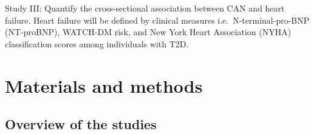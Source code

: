\documentclass[
  a4paper,
  headsepline=true,
  open=left]{scrbook}
\begin{document}
Study III: Quantify the cross-sectional association between CAN and
heart failure. Heart failure will be defined by clinical measures
i.e.~N-terminal-pro-BNP (NT-proBNP), WATCH-DM risk, and New York Heart
Association (NYHA) classification scores among individuals with T2D.

\clearpage
\null
\thispagestyle{empty}
\clearpage


\hypertarget{materials-and-methods}{%
\chapter{Materials and methods}\label{materials-and-methods}}

\clearpage
\null
\thispagestyle{empty}
\clearpage

\hypertarget{overview-of-the-studies}{%
\section{Overview of the studies}\label{overview-of-the-studies}}
\end{document}
